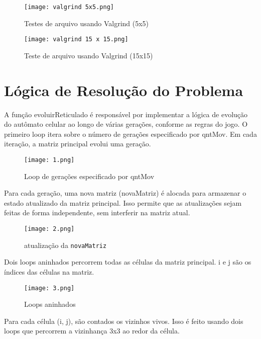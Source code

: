 \documentclass[a4paper,12pt]{article}
\begin{document}
\begin{figure}[H]
        \centering
        \texttt{[image: valgrind 5x5.png]}
        \caption{Testes de arquivo usando Valgrind (5x5)}
        \label{fig:enter-label8}
    \end{figure}
    
\begin{figure}[H]
        \centering
        \texttt{[image: valgrind 15 x 15.png]}
        \caption{Teste de arquivo usando Valgrind (15x15)}
        \label{fig:enter-label9}
\end{figure}

\section{Lógica de Resolução do Problema}

\small A função evoluirReticulado é responsável por implementar a lógica de evolução do autômato celular ao longo de várias gerações, conforme as regras do jogo.
O primeiro loop itera sobre o número de gerações especificado por qntMov. Em cada iteração, a matriz principal evolui uma geração.

\begin{figure}[H]
        \centering
        \texttt{[image: 1.png]}
        \caption{Loop de gerações especificado por qntMov}
        \label{fig:enter-label10}
\end{figure}

Para cada geração, uma nova matriz (novaMatriz) é alocada para armazenar o estado atualizado da matriz principal. Isso permite que as atualizações sejam feitas de forma independente, sem interferir na matriz atual.

\begin{figure}[H]
        \centering
        \texttt{[image: 2.png]}
        \caption{atualização da \texttt{novaMatriz}}
        \label{fig:enter-label11}
\end{figure}

Dois loops aninhados percorrem todas as células da matriz principal. i e j são os índices das células na matriz.

\begin{figure}[H]
        \centering
        \texttt{[image: 3.png]}
        \caption{Loops aninhados}
        \label{fig:enter-label12}
\end{figure}

Para cada célula (i, j), são contados os vizinhos vivos. Isso é feito usando dois loops que percorrem a vizinhança 3x3 ao redor da célula.
\end{document}
